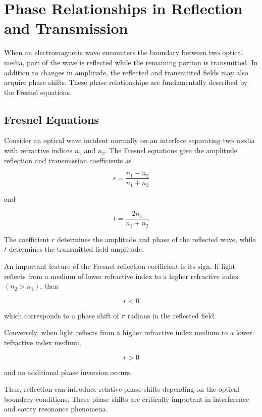 \documentclass{report}
\begin{document}
\section{Phase Relationships in Reflection and Transmission}

When an electromagnetic wave encounters the boundary between two optical media, part of the wave is reflected while the remaining portion is transmitted. In addition to changes in amplitude, the reflected and transmitted fields may also acquire phase shifts. These phase relationships are fundamentally described by the Fresnel equations.

\subsection{Fresnel Equations}

Consider an optical wave incident normally on an interface separating two media with refractive indices $n_1$ and $n_2$. The Fresnel equations give the amplitude reflection and transmission coefficients as

\begin{equation}
r = \frac{n_1-n_2}{n_1+n_2}
\end{equation}

and

\begin{equation}
t = \frac{2n_1}{n_1+n_2}
\end{equation}

The coefficient $r$ determines the amplitude and phase of the reflected wave, while $t$ determines the transmitted field amplitude.

An important feature of the Fresnel reflection coefficient is its sign. If light reflects from a medium of lower refractive index to a higher refractive index $(n_2 > n_1)$, then

\begin{equation}
r < 0
\end{equation}

which corresponds to a phase shift of $\pi$ radians in the reflected field.

Conversely, when light reflects from a higher refractive index medium to a lower refractive index medium,

\begin{equation}
r > 0
\end{equation}

and no additional phase inversion occurs.

Thus, reflection can introduce relative phase shifts depending on the optical boundary conditions. These phase shifts are critically important in interference and cavity resonance phenomena.
\end{document}
